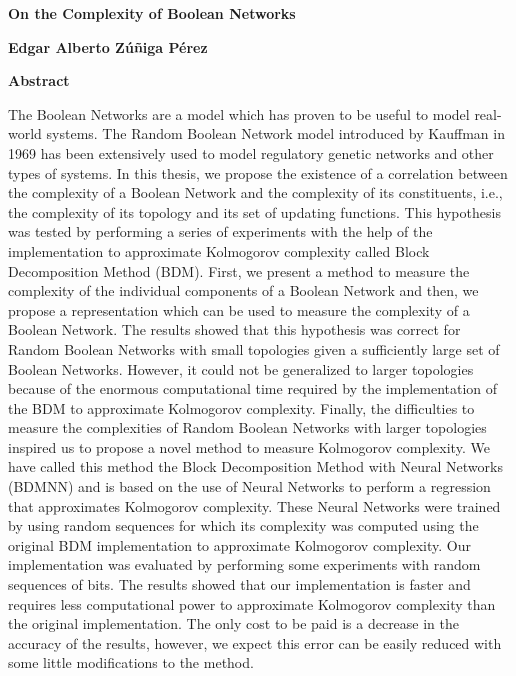 \thispagestyle{plain}
\begin{center}
	\Large
	\textbf{On the Complexity of Boolean Networks}
	
	\vspace{0.4cm}
	\large
	
	\vspace{0.4cm}
	\textbf{Edgar Alberto Zúñiga Pérez}
	
	\vspace{0.9cm}
	\textbf{Abstract}
\end{center}
The Boolean Networks are a model which has proven to be useful to model real-world systems. The Random Boolean Network model introduced by Kauffman in 1969 has been extensively used to model regulatory genetic networks and other types of systems. In this thesis, we propose the existence of a correlation between the complexity of a Boolean Network and the complexity of its constituents, i.e., the complexity of its topology and its set of updating functions. This hypothesis was tested by performing a series of experiments with the help of the implementation to approximate Kolmogorov complexity called Block Decomposition Method (BDM). First, we present a method to measure the complexity of the individual components of a Boolean Network and then, we propose a representation which can be used to measure the complexity of a Boolean Network. The results showed that this hypothesis was correct for Random Boolean Networks with small topologies given a sufficiently large set of Boolean Networks. However, it could not be generalized to larger topologies because of the enormous computational time required by the implementation of the BDM to approximate Kolmogorov complexity. Finally, the difficulties to measure the complexities of Random Boolean Networks with larger topologies inspired us to propose a novel method to measure Kolmogorov complexity. We have called this method the Block Decomposition Method with Neural Networks (BDMNN) and is based on the use of Neural Networks to perform a regression that approximates Kolmogorov complexity. These Neural Networks were trained by using random sequences for which its complexity was computed using the original BDM implementation to approximate Kolmogorov complexity. Our implementation was evaluated by performing some experiments with random sequences of bits. The results showed that our implementation is faster and requires less computational power to approximate Kolmogorov complexity than the original implementation. The only cost to be paid is a decrease in the accuracy of the results, however, we expect this error can be easily reduced with some little modifications to the method.